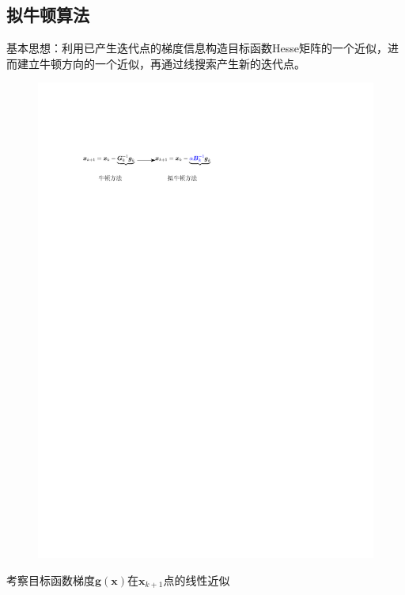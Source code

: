 \subsection{拟牛顿算法}
\begin{note}
    基本思想：利用已产生迭代点的梯度信息构造目标函数Hesse矩阵的一个近似，进而建立牛顿方向的一个近似，再通过线搜索产生新的迭代点。
    \begin{figure}[htbp]
        \centering
        \includegraphics{image/拟牛顿方程.pdf}
    \end{figure}
\end{note}
考察目标函数梯度$\boldsymbol{g}(\boldsymbol{x})$在$\boldsymbol{x}_{k+1}$点的线性近似
